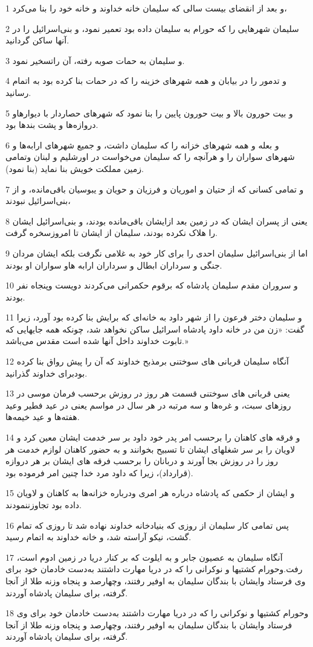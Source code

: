 \par 1 و بعد از انقضای بیست سالی که سلیمان خانه خداوند و خانه خود را بنا می‌کرد،
\par 2 سلیمان شهرهایی را که حورام به سلیمان داده بود تعمیر نمود، و بنی‌اسرائیل را در آنها ساکن گردانید.
\par 3 و سلیمان به حمات صوبه رفته، آن راتسخیر نمود.
\par 4 و تدمور را در بیابان و همه شهرهای خزینه را که در حمات بنا کرده بود به اتمام رسانید.
\par 5 و بیت حورون بالا و بیت حورون پایین را بنا نمود که شهرهای حصاردار با دیوارهاو دروازه‌ها و پشت بندها بود.
\par 6 و بعله و همه شهرهای خزانه را که سلیمان داشت، و جمیع شهرهای ارابه‌ها و شهرهای سواران را و هرآنچه را که سلیمان می‌خواست در اورشلیم و لبنان وتمامی زمین مملکت خویش بنا نماید (بنا نمود).
\par 7 و تمامی کسانی که از حتیان و اموریان و فرزیان و حویان و یبوسیان باقی‌مانده، و از بنی‌اسرائیل نبودند،
\par 8 یعنی از پسران ایشان که در زمین بعد ازایشان باقی‌مانده بودند، و بنی‌اسرائیل ایشان را هلاک نکرده بودند، سلیمان از ایشان تا امروزسخره گرفت.
\par 9 اما از بنی‌اسرائیل سلیمان احدی را برای کار خود به غلامی نگرفت بلکه ایشان مردان جنگی و سرداران ابطال و سرداران ارابه هاو سواران او بودند.
\par 10 و سروران مقدم سلیمان پادشاه که برقوم حکمرانی می‌کردند دویست وپنجاه نفر بودند.
\par 11 و سلیمان دختر فرعون را از شهر داود به خانه‌ای که برایش بنا کرده بود آورد، زیرا گفت: «زن من در خانه داود پادشاه اسرائیل ساکن نخواهد شد، چونکه همه جایهایی که تابوت خداوند داخل آنها شده است مقدس می‌باشد.»
\par 12 آنگاه سلیمان قربانی های سوختنی برمذبح خداوند که آن را پیش رواق بنا کرده بودبرای خداوند گذرانید.
\par 13 یعنی قربانی های سوختنی قسمت هر روز در روزش برحسب فرمان موسی در روزهای سبت، و غره‌ها و سه مرتبه در هر سال در مواسم یعنی در عید فطیر وعید هفته‌ها و عید خیمه‌ها.
\par 14 و فرقه های کاهنان را برحسب امر پدر خود داود بر سر خدمت ایشان معین کرد و لاویان را بر سر شغلهای ایشان تا تسبیح بخوانند و به حضور کاهنان لوازم خدمت هر روز را در روزش بجا آورند و دربانان را برحسب فرقه های ایشان بر هر دروازه (قرارداد)، زیرا که داود مرد خدا چنین امر فرموده بود.
\par 15 و ایشان از حکمی که پادشاه درباره هر امری ودرباره خزانه‌ها به کاهنان و لاویان داده بود تجاوزننمودند.
\par 16 پس تمامی کار سلیمان از روزی که بنیادخانه خداوند نهاده شد تا روزی که تمام گشت، نیکو آراسته شد، و خانه خداوند به اتمام رسید.
\par 17 آنگاه سلیمان به عصیون جابر و به ایلوت که بر کنار دریا در زمین ادوم است، رفت.وحورام کشتیها و نوکرانی را که در دریا مهارت داشتند به‌دست خادمان خود برای وی فرستاد وایشان با بندگان سلیمان به اوفیر رفتند، وچهارصد و پنجاه وزنه طلا از آنجا گرفته، برای سلیمان پادشاه آوردند.
\par 18 وحورام کشتیها و نوکرانی را که در دریا مهارت داشتند به‌دست خادمان خود برای وی فرستاد وایشان با بندگان سلیمان به اوفیر رفتند، وچهارصد و پنجاه وزنه طلا از آنجا گرفته، برای سلیمان پادشاه آوردند.
 
